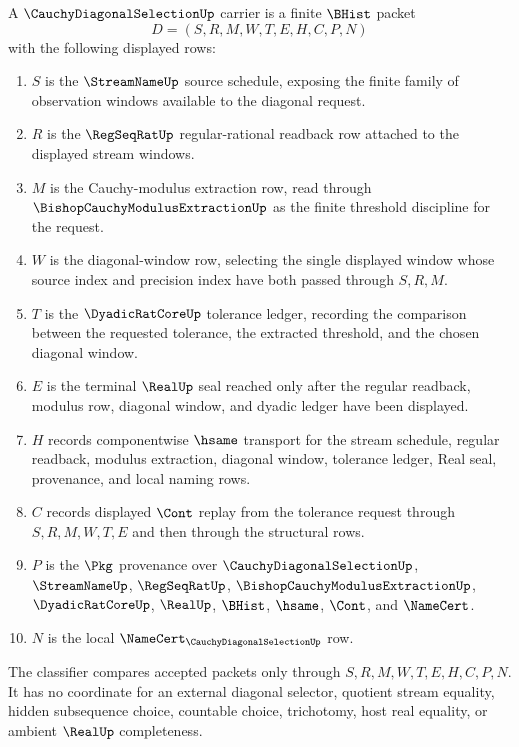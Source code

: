 \begin{definition}
\label{def:cauchy-diagonal-selection-carrier}
A $\CauchyDiagonalSelectionUp$ carrier is a finite $\BHist$ packet
$$
D=(S,R,M,W,T,E,H,C,P,N)
$$
with the following displayed rows:
\begin{enumerate}
\item $S$ is the $\StreamNameUp$ source schedule, exposing the finite family of observation windows available to the diagonal request.
\item $R$ is the $\RegSeqRatUp$ regular-rational readback row attached to the displayed stream windows.
\item $M$ is the Cauchy-modulus extraction row, read through $\BishopCauchyModulusExtractionUp$ as the finite threshold discipline for the request.
\item $W$ is the diagonal-window row, selecting the single displayed window whose source index and precision index have both passed through $S,R,M$.
\item $T$ is the $\DyadicRatCoreUp$ tolerance ledger, recording the comparison between the requested tolerance, the extracted threshold, and the chosen diagonal window.
\item $E$ is the terminal $\RealUp$ seal reached only after the regular readback, modulus row, diagonal window, and dyadic ledger have been displayed.
\item $H$ records componentwise $\hsame$ transport for the stream schedule, regular readback, modulus extraction, diagonal window, tolerance ledger, Real seal, provenance, and local naming rows.
\item $C$ records displayed $\Cont$ replay from the tolerance request through $S,R,M,W,T,E$ and then through the structural rows.
\item $P$ is the $\Pkg$ provenance over $\CauchyDiagonalSelectionUp$, $\StreamNameUp$, $\RegSeqRatUp$, $\BishopCauchyModulusExtractionUp$, $\DyadicRatCoreUp$, $\RealUp$, $\BHist$, $\hsame$, $\Cont$, and $\NameCert$.
\item $N$ is the local $\NameCert_{\CauchyDiagonalSelectionUp}$ row.
\end{enumerate}
The classifier compares accepted packets only through $S,R,M,W,T,E,H,C,P,N$. It has no coordinate for an external diagonal selector, quotient stream equality, hidden subsequence choice, countable choice, trichotomy, host real equality, or ambient $\RealUp$ completeness.
\end{definition}

